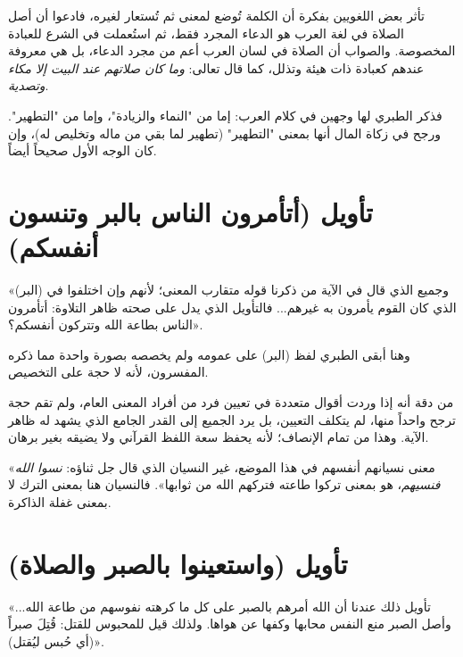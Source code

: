 \begin{fawaid}
تأثر بعض اللغويين بفكرة أن الكلمة تُوضع لمعنى ثم تُستعار لغيره، فادعوا أن أصل الصلاة في لغة العرب هو الدعاء المجرد فقط، ثم استُعملت في الشرع للعبادة المخصوصة. والصواب أن الصلاة في لسان العرب أعم من مجرد الدعاء، بل هي معروفة عندهم كعبادة ذات هيئة وتذلل، كما قال تعالى: \textit{وما كان صلاتهم عند البيت إلا مكاء وتصدية}.
\end{fawaid}

 فذكر الطبري لها وجهين في كلام العرب: إما من "النماء والزيادة"، وإما من "التطهير". ورجح في زكاة المال أنها بمعنى "التطهير" (تطهير لما بقي من ماله وتخليص له)، وإن كان الوجه الأول صحيحاً أيضاً.

\separator

\section{تأويل (أتأمرون الناس بالبر وتنسون أنفسكم)}
 «وجميع الذي قال في الآية من ذكرنا قوله متقارب المعنى؛ لأنهم وإن اختلفوا في (البر) الذي كان القوم يأمرون به غيرهم... فالتأويل الذي يدل على صحته ظاهر التلاوة: أتأمرون الناس بطاعة الله وتتركون أنفسكم؟».

وهنا أبقى الطبري لفظ (البر) على عمومه ولم يخصصه بصورة واحدة مما ذكره المفسرون، لأنه لا حجة على التخصيص.

\begin{fawaid}
من دقة  أنه إذا وردت أقوال متعددة في تعيين فرد من أفراد المعنى العام، ولم تقم حجة ترجح واحداً منها، لم يتكلف التعيين، بل يرد الجميع إلى القدر الجامع الذي يشهد له ظاهر الآية. وهذا من تمام الإنصاف؛ لأنه يحفظ سعة اللفظ القرآني ولا يضيقه بغير برهان.
\end{fawaid}

 «معنى نسيانهم أنفسهم في هذا الموضع، غير النسيان الذي قال جل ثناؤه: \textit{نسوا الله فنسيهم}، هو بمعنى تركوا طاعته فتركهم الله من ثوابها». فالنسيان هنا بمعنى الترك لا بمعنى غفلة الذاكرة.

\separator

\section{تأويل (واستعينوا بالصبر والصلاة)}
 «تأويل ذلك عندنا أن الله أمرهم بالصبر على كل ما كرهته نفوسهم من طاعة الله... وأصل الصبر منع النفس محابها وكفها عن هواها. ولذلك قيل للمحبوس للقتل: قُتِلَ صبراً (أي حُبس ليُقتل)».

